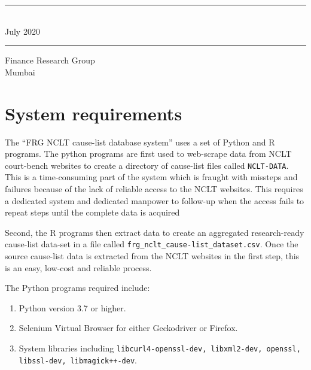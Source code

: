 \documentclass[12pt,a4paper]{article}
\begin{document}
\begin{titlepage}


  \parbox{\textwidthorig}{ \hrule %
    \vspace{\baselineskip}
    \\[1ex]
    July 2020 \vspace{\baselineskip} %
    \hrule %
  }

  
  \parbox{\textwidthorig}{ \center
    Finance Research Group\\[1ex]
    Mumbai}
\end{titlepage}

\newpage

\section{System requirements}

The ``FRG NCLT cause-list database system'' uses a set of Python and R programs. The python programs are first used to web-scrape data from NCLT court-bench websites to create a directory of cause-list files called \texttt{NCLT-DATA}. This is a time-consuming part of the system which is fraught with missteps and failures because of the lack of reliable access to the NCLT websites. This requires a dedicated system and dedicated manpower to follow-up when the access fails to repeat steps until the complete data is acquired

Second, the R programs then extract data to create an aggregated research-ready cause-list data-set in a file called \texttt{frg\_nclt\_cause-list\_dataset.csv}.  Once the source cause-list data is extracted from the NCLT websites in the first step, this is an easy, low-cost and reliable process.

The Python programs required include:
\begin{enumerate}
\item Python version 3.7 or higher.
\item Selenium Virtual Browser for either Geckodriver or Firefox.
\item System libraries including \texttt{libcurl4-openssl-dev, libxml2-dev, openssl, libssl-dev, libmagick++-dev}.
\end{enumerate}
\end{document}

